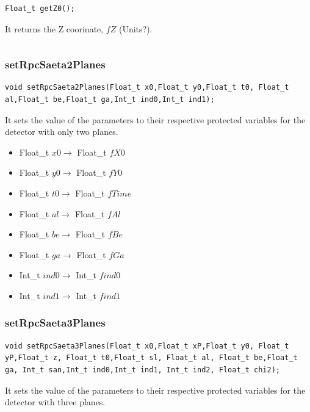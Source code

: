 \documentclass[a4paper]{book}
\begin{document}
\begin{lstlisting}[style=customc]
Float_t getZ0();
\end{lstlisting}

It returns the Z coorinate, $fZ$ (Units?).

\[\]

\subsubsection{setRpcSaeta2Planes}

\begin{lstlisting}[style=customc]
void setRpcSaeta2Planes(Float_t x0,Float_t y0,Float_t t0, Float_t al,Float_t be,Float_t ga,Int_t ind0,Int_t ind1);
\end{lstlisting}

It sets the value of the parameters to their respective protected variables for the detector with only two planes.

\begin{itemize}
	\item Float\_t $x0 \rightarrow$ Float\_t $fX0$
	\item Float\_t $y0 \rightarrow$ Float\_t $fY0$
	\item Float\_t $t0 \rightarrow$ Float\_t $fTime$
	\item Float\_t $al \rightarrow$ Float\_t $fAl$
	\item Float\_t $be \rightarrow$ Float\_t $fBe$
	\item Float\_t $ga \rightarrow$ Float\_t $fGa$
	\item Int\_t $ind0 \rightarrow$ Int\_t $find0$
	\item Int\_t $ind1 \rightarrow$ Int\_t $find1$
\end{itemize}

\subsubsection{setRpcSaeta3Planes}

\begin{lstlisting}[style=customc]
void setRpcSaeta3Planes(Float_t x0,Float_t xP,Float_t y0, Float_t yP,Float_t z, Float_t t0,Float_t sl, Float_t al, Float_t be,Float_t ga, Int_t san,Int_t ind0,Int_t ind1, Int_t ind2, Float_t chi2);
\end{lstlisting}

It sets the value of the parameters to their respective protected variables for the detector with three planes.
\end{document}
